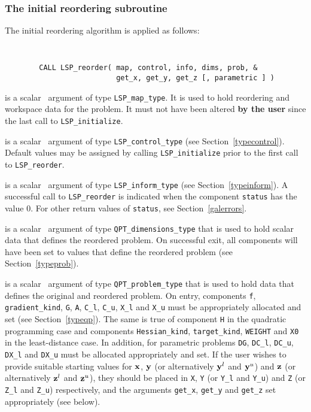 \documentclass{galahad}
\newcommand{\packagename}{LSP}
\begin{document}
\subsubsection{The initial reordering subroutine}
The initial reordering algorithm is applied as follows:
\vspace*{-2mm}
{\tt
\begin{verbatim}
        CALL LSP_reorder( map, control, info, dims, prob, &
                          get_x, get_y, get_z [, parametric ] )
\end{verbatim}
}
\vspace*{-4mm}
\begin{description}
 is a scalar \intentinout\ argument of type
{\tt \packagename\_map\_type}.
It is used to hold reordering and workspace data for the problem.
It must not have been altered {\bf by the user} since the last call
to {\tt \packagename\_initialize}.

 is a scalar \intentin\ argument of type
{\tt \packagename\_control\_type}
(see Section~\ref{typecontrol}).
Default values may be assigned by calling
{\tt \packagename\_initialize}
prior to the first call to {\tt \packagename\_reorder}.

 is a scalar \intentout\ argument of type
{\tt \packagename\_inform\_type}
(see Section~\ref{typeinform}).
A successful call to {\tt \packagename\_reor\-der} is indicated
when the component {\tt status} has the value 0. For other return values
of {\tt status}, see Section~\ref{galerrors}.

 is a scalar \intentout\ argument of type
{\tt QPT\_dimensions\_type} that
is used to hold scalar data that defines the reordered problem.
On successful exit, all components will have been set to values
that define the reordered problem (see Section~\ref{typeprob}).

 is a scalar \intentinout\ argument of type
{\tt QPT\_problem\_type} that
is used to hold data that defines the original and reordered problem.
On entry, components {\tt f}, {\tt gradient\_kind}, {\tt G},
{\tt A}, {\tt C\_l}, {\tt C\_u}, {\tt X\_l} and {\tt X\_u}
must be appropriately allocated and set (see Section~\ref{typeqp}).
The same is true of component {\tt H} in the quadratic programming case
and components {\tt Hessian\_kind}, {\tt target\_kind},
{\tt WEIGHT} and {\tt X0} in the least-distance case.
In addition, for parametric problems
{\tt DG}, {\tt DC\_l}, {\tt DC\_u}, {\tt DX\_l} and {\tt DX\_u}
must be allocated appropriately and set.
If the user wishes to provide suitable starting values for ${\mathbf{x}}$, ${\mathbf{y}}$
(or alternatively ${\mathbf{y}}^l$ and ${\mathbf{y}}^u$) and
${\mathbf{z}}$ (or alternatively ${\mathbf{z}}^l$ and ${\mathbf{z}}^u$),
they should be placed in {\tt X}, {\tt Y} (or {\tt Y\_l} and {\tt Y\_u})
and {\tt Z} (or {\tt Z\_l} and {\tt Z\_u}) respectively,
and the arguments {\tt get\_x}, {\tt get\_y} and {\tt get\_z}
set appropriately (see below).


\end{description}
\end{document}

